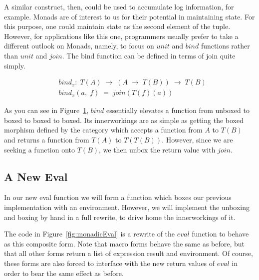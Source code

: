A similar construct, then, could be used to accumulate log information, for example.
Monads are of interest to us for their potential in maintaining state. For this
purpose, one could maintain state as the second element of the tuple. However, for
applications like this one, programmers usually prefer to take a different outlook on
Monads, namely, to focus on $unit$ and $bind$ functions rather than $unit$ and $join$.
The bind function can be defined in terms of join quite simply.

\begin{figure}[htp]
\footnotesize
\caption{}\label{fig:bindDef}
\begin{align*}
& bind_{x}: \; T(A) \; \to \; (A \; \to \; T(B)) \; \to \; T(B)
\\& bind_{x}(a, \; f) \; = \; join(T(f)(a))
\end{align*}
\end{figure}

As you can see in Figure~\ref{fig:bindDef}, $bind$ essentially elevates a
function from unboxed to boxed to boxed to boxed. Its innerworkings are as
simple as getting the boxed morphism defined by the category which accepts a
function from $A$ to $T(B)$ and returns a function from $T(A)$ to $T(T(B))$.
However, since we are seeking a function onto $T(B)$, we then unbox the return
value with $join$.

\subsection{A New Eval}
In our new eval function we will form a function which boxes our previous
implementation with an environment. However, we will implement the unboxing
and boxing by hand in a full rewrite, to drive home the innerworkings of it.

The code in Figure~\ref{fig:monadicEval} is a rewrite of the $eval$ function to
behave as this composite form. Note that macro forms behave the same as before,
but that all other forms return a list of expression result and environment. Of
course, these forms are also forced to interface with the new return values of
$eval$ in order to bear the same effect as before.

